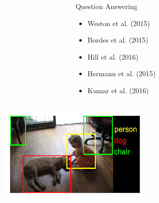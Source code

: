 \documentclass{beamer}
\begin{document}
\begin{frame}
\begin{figure}
\begin{minipage}[t][7cm][t]{\textwidth}
\begin{overprint}
\begin{columns}
\begin{column}{0.6\textwidth}
\begin{figure}[ht]
							\end{figure}
						\end{column}
						\begin{column}{0.4\textwidth}
							\begin{block}{Question Answering}
								\begin{itemize}
									\item Weston et al. (2015) 
									\item Bordes et al. (2015)
									\item Hill et al. (2016)
									\item Hermann et al. (2015)
									\item Kumar et al. (2016)
								\end{itemize}
							\end{block}
						\end{column}
					\end{columns}
					\onslide<6>
					\begin{columns}
						\begin{column}{0.6\textwidth}
							\begin{figure}[ht]
								\centering
								\includegraphics[width=1\linewidth]{images/or}
								\label{fig:or}
								

\end{figure}
\end{column}
\end{columns}
\end{overprint}
\end{minipage}
\end{figure}
\end{frame}
\end{document}
